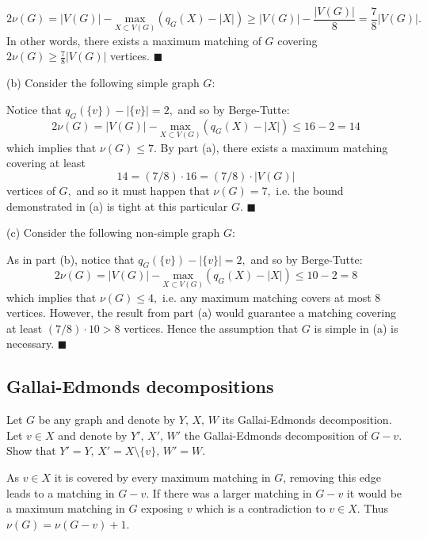 \documentclass{article}
\begin{document}
  $$2\nu(G)=|V(G)|-\underset{X\subset V(G)}{\text{max}}(q_G(X)-|X|)\geq |V(G)|-\frac{|V(G)|}{8}=\frac{7}{8}|V(G)|.$$
  In other words, there exists a maximum matching of $G$ covering $2\nu(G)\geq \frac{7}{8}|V(G)|$ vertices. $\blacksquare$




  \newpage

  (b) Consider the following simple graph $G$:

  \begin{figure}[h]
  \begin{center}
    
    \end{center}
  \end{figure}
  Notice that $q_G(\{v\})-|\{v\}|=2,$ and so by Berge-Tutte: $$2\nu(G)=|V(G)|-\underset{X\subset V(G)}{\text{max}}(q_G(X)-|X|)\leq 16-2=14$$which implies that $\nu(G)\leq 7.$ By part (a), there exists a maximum matching covering at least $$14=(7/8)\cdot 16=(7/8)\cdot |V(G)|$$vertices of $G,$ and so it must happen that $\nu(G)=7,$ i.e. the bound demonstrated in (a) is tight at this particular $G$. $\blacksquare$

  (c) Consider the following non-simple graph $G$:

  \begin{figure}[h]
  \begin{center}
    
    \end{center}
  \end{figure}

  As in part (b), notice that $q_G(\{v\})-|\{v\}|=2,$ and so by Berge-Tutte: $$2\nu(G)=|V(G)|-\underset{X\subset V(G)}{\text{max}}(q_G(X)-|X|)\leq 10-2=8$$which implies that $\nu(G)\leq 4,$ i.e. any maximum matching covers at most $8$ vertices. However, the result from part (a) would guarantee a matching covering at least $ (7/8)\cdot 10>8$ vertices. Hence the assumption that $G$ is simple in (a) is necessary. $\blacksquare$

  \subsection{Gallai-Edmonds decompositions}
  \begin{centerframebox}
    Let $G$ be any graph and denote by $Y,\, X,\, W$ its Gallai-Edmonds decomposition.
    Let $v \in X$ and denote by $Y',\, X',\, W'$ the Gallai-Edmonds decomposition of $G - v$.
    Show that $Y' = Y,\, X' = X \setminus \{v\},\, W' = W$.
  \end{centerframebox}
  As $v\in X$ it is covered by every maximum matching in $G$, removing this edge leads to a matching in $G-v$. If there was a larger matching in $G-v$ it would be a maximum matching in $G$ exposing $v$ which is a contradiction to $v\in X$. Thus $\nu(G)=\nu(G-v)+1$.
\end{document}
